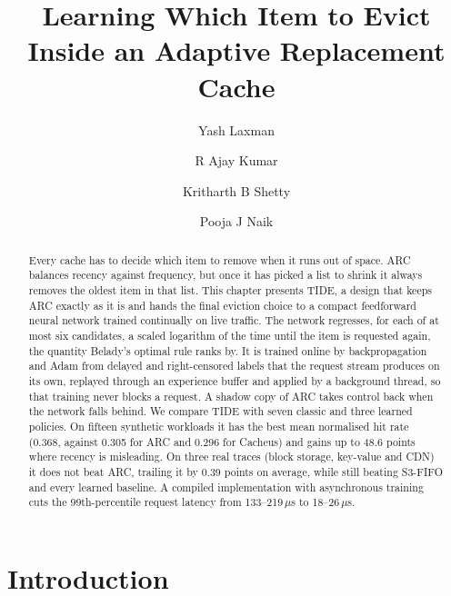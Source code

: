 \documentclass{llncs}
\begin{document}
\pagestyle{plain}

\title{Learning Which Item to Evict Inside an Adaptive Replacement Cache}

\author{Yash Laxman \and R Ajay Kumar \and Kritharth B Shetty \and Pooja J Naik}


\maketitle

\begin{abstract}
Every cache has to decide which item to remove when it runs out of space. ARC balances recency against frequency, but once it has picked a list to shrink it always removes the oldest item in that list. This chapter presents TIDE, a design that keeps ARC exactly as it is and hands the final eviction choice to a compact feedforward neural network trained continually on live traffic. The network regresses, for each of at most six candidates, a scaled logarithm of the time until the item is requested again, the quantity Belady's optimal rule ranks by. It is trained online by backpropagation and Adam from delayed and right-censored labels that the request stream produces on its own, replayed through an experience buffer and applied by a background thread, so that training never blocks a request. A shadow copy of ARC takes control back when the network falls behind. We compare TIDE with seven classic and three learned policies. On fifteen synthetic workloads it has the best mean normalised hit rate (0.368, against 0.305 for ARC and 0.296 for Cacheus) and gains up to 48.6 points where recency is misleading. On three real traces (block storage, key-value and CDN) it does not beat ARC, trailing it by 0.39 points on average, while still beating S3-FIFO and every learned baseline. A compiled implementation with asynchronous training cuts the 99th-percentile request latency from 133--219\,$\mu$s to 18--26\,$\mu$s.

\end{abstract}

\section{Introduction}
\label{sec:intro}
\end{document}
